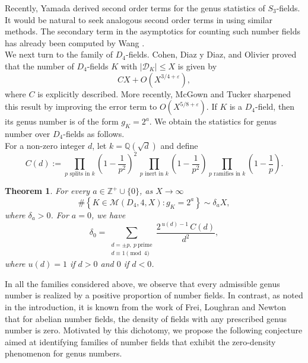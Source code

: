 \documentclass[11pt,reqno]{amsart}
\newcommand{\Q}{\mathbb{Q}}
\newcommand{\Z}{\mathbb{Z}}
\newcommand{\cD}{\mathcal{D}}
\newcommand{\cM}{\mathcal{M}}
\newtheorem{theorem}{Theorem}[section]
\theoremstyle{definition}
\theoremstyle{remark}
\begin{document}
Recently, Yamada \cite{Yam26} derived second order terms for the genus statistics of $S_3$-fields. It would be natural to seek analogous second order terms in  using similar methods. The secondary term in the asymptotics for counting such number fields has already been computed by Wang \cite{wang2017secondaryterm}.\\

We next turn to the family of $D_{4}$-fields. Cohen, Diaz y Diaz, and Olivier \cite{CDO02} proved that the number of $D_{4}$-fields $K$ with $|\cD_K| \leq X$ is given by
\begin{equation*}
    CX + O\left(X^{3/4+\varepsilon}\right),
\end{equation*}
where $C$ is explicitly described. More recently, McGown and Tucker \cite{McTu24} sharpened this result by improving the error term to $O(X^{5/8 +\varepsilon})$. If $K$ is a $D_4$-field, then its genus number is of the form $g_K = 2^a$. We obtain the statistics for genus number over $D_4$-fields as follows.\\ 

\noindent
For a non-zero integer $d$, let $k=\Q(\sqrt{d})$ and define
\begin{equation*}
    C(d):= \prod_{p\text{ splits in }k} \left(1-\frac{1}{p^2}\right)^2 \, \prod_{p \text{ inert in } k}\left(1-\frac{1}{p^2}\right) \prod_{p\text{ ramifies in }k}\left(1-\frac{1}{p}\right).
\end{equation*}
\begin{theorem}\label{thm:D4-genus1-upper}
For every $a\in \Z^+\cup\{0\}$, as $X\to\infty$
\begin{equation*}
    \#\left\{ K\in \cM(D_4,4,X): g_K= 2^a\right\} \sim \delta_a X,
\end{equation*}
where $\delta_a>0$. For $a=0$, we have
\[
\delta_0 = \sum_{\substack{d = \pm p,\ p\ \text{prime}\\ 
d \equiv 1 \pmod{4}}}
\frac{2^{\,u(d)-1}\, C(d)}{d^2}, 
\]
where $u(d)=1$ if $d>0$ and $0$ if $d<0$. 
\end{theorem}

In all the families considered above, we observe that every admissible genus number is realized by a positive proportion of number fields. In contrast, as noted in the introduction, it is known from the work of Frei, Loughran and Newton \cite{FDR23} that for abelian number fields, the density of fields with any prescribed genus number is zero. Motivated by this dichotomy, we propose the following conjecture aimed at identifying families of number fields that exhibit the zero-density phenomenon for genus numbers.\\
\end{document}
